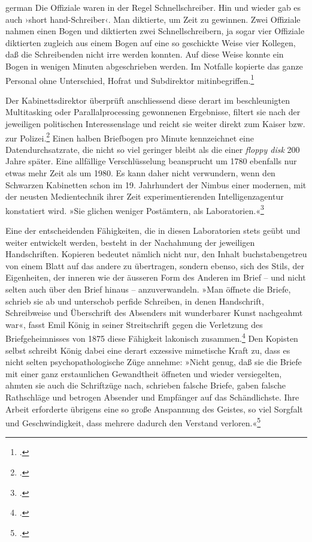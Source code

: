 \documentclass[a4paper,12pt]{article}
\newcommand{\anf}[1]{»#1«}
\newenvironment{zitat}{
\begin{foreigndisplayquote}{german}}%
{\end{foreigndisplayquote}}
\begin{document}
\begin{zitat}
Die Offiziale waren in der Regel Schnellschreiber. Hin und wieder gab es auch ›short hand-Schreiber‹. Man diktierte, um Zeit zu gewinnen. Zwei Offiziale nahmen einen Bogen und diktierten zwei Schnellschreibern, ja sogar vier Offiziale diktierten zugleich aus einem Bogen auf eine so geschickte Weise vier Kollegen, daß die Schreibenden nicht irre werden konnten. Auf diese Weise konnte ein Bogen in wenigen Minuten abgeschrieben werden. Im Notfalle kopierte das ganze Personal ohne Unterschied, Hofrat und Subdirektor mitinbegriffen.\footcite[139]{stix:1937}
\end{zitat}
Der Kabinettsdirektor überprüft anschliessend diese derart im beschleunigten Multitasking oder Parallalprocessing gewonnenen Ergebnisse, filtert sie nach der jeweiligen politischen Interessenslage und reicht sie weiter direkt zum Kaiser bzw. zur Polizei.\footcite[140]{stix:1937} Einen halben Briefbogen pro Minute kennzeichnet eine Datendurchsatzrate, die nicht so viel geringer bleibt als die einer \emph{floppy disk} 200 Jahre später. Eine allfällige Verschlüsselung beansprucht um 1780 ebenfalls nur etwas mehr Zeit als um 1980. Es kann daher nicht verwundern, wenn den Schwarzen Kabinetten schon im 19. Jahrhundert der Nimbus einer modernen, mit der neusten Medientechnik ihrer Zeit experimentierenden Intelligenzagentur konstatiert wird. \anf{Sie glichen weniger Postämtern, als Laboratorien.}\footcite[40]{koenig:1875}

Eine der entscheidenden Fähigkeiten, die in diesen Laboratorien stets geübt und weiter entwickelt werden, besteht in der Nachahmung der jeweiligen Handschriften. Kopieren bedeutet nämlich nicht nur, den Inhalt buchstabengetreu von einem Blatt auf das andere zu übertragen, sondern ebenso, sich des Stils, der Eigenheiten, der inneren wie der äusseren Form des Anderen im Brief – und nicht selten auch über den Brief hinaus – anzuverwandeln. \anf{Man öffnete die Briefe, schrieb sie ab und unterschob perfide Schreiben, in denen Handschrift, Schreibweise und Überschrift des Absenders mit wunderbarer Kunst nachgeahmt war}, fasst Emil König in seiner Streitschrift gegen die Verletzung des Briefgeheimnisses von 1875 diese Fähigkeit lakonisch zusammen.\footcite[34]{koenig:1875} Den Kopisten selbst schreibt König dabei eine derart exzessive mimetische Kraft zu, dass es nicht selten psychopathologische Züge annehme: \anf{Nicht genug, daß sie die Briefe mit einer ganz erstaunlichen Gewandtheit öffneten und wieder versiegelten, ahmten sie auch die Schriftzüge nach, schrieben falsche Briefe, gaben falsche Rathschläge und betrogen Absender und Empfänger auf das Schändlichste. Ihre Arbeit erforderte übrigens eine so große Anspannung des Geistes, so viel Sorgfalt und Geschwindigkeit, dass mehrere dadurch den Verstand verloren.}\footcite[38]{koenig:1875} 
\end{document}
